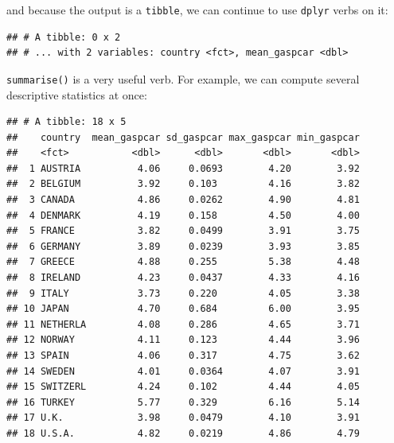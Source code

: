 \documentclass[]{gitbook}
\newenvironment{Shaded}{\begin{snugshade}}{\end{snugshade}}
\newcommand{\DataTypeTok}[1]{\textcolor[rgb]{0.13,0.29,0.53}{#1}}
\newcommand{\KeywordTok}[1]{\textcolor[rgb]{0.13,0.29,0.53}{\textbf{#1}}}
\newcommand{\NormalTok}[1]{#1}
\newcommand{\OperatorTok}[1]{\textcolor[rgb]{0.81,0.36,0.00}{\textbf{#1}}}
\newcommand{\StringTok}[1]{\textcolor[rgb]{0.31,0.60,0.02}{#1}}
\begin{document}
and because the output is a \texttt{tibble}, we can continue to use \texttt{dplyr} verbs on it:

\begin{Shaded}
\end{Shaded}

\begin{verbatim}
## # A tibble: 0 x 2
## # ... with 2 variables: country <fct>, mean_gaspcar <dbl>
\end{verbatim}

\texttt{summarise()} is a very useful verb. For example, we can compute several descriptive statistics at once:

\begin{Shaded}
\end{Shaded}

\begin{verbatim}
## # A tibble: 18 x 5
##    country  mean_gaspcar sd_gaspcar max_gaspcar min_gaspcar
##    <fct>           <dbl>      <dbl>       <dbl>       <dbl>
##  1 AUSTRIA          4.06     0.0693        4.20        3.92
##  2 BELGIUM          3.92     0.103         4.16        3.82
##  3 CANADA           4.86     0.0262        4.90        4.81
##  4 DENMARK          4.19     0.158         4.50        4.00
##  5 FRANCE           3.82     0.0499        3.91        3.75
##  6 GERMANY          3.89     0.0239        3.93        3.85
##  7 GREECE           4.88     0.255         5.38        4.48
##  8 IRELAND          4.23     0.0437        4.33        4.16
##  9 ITALY            3.73     0.220         4.05        3.38
## 10 JAPAN            4.70     0.684         6.00        3.95
## 11 NETHERLA         4.08     0.286         4.65        3.71
## 12 NORWAY           4.11     0.123         4.44        3.96
## 13 SPAIN            4.06     0.317         4.75        3.62
## 14 SWEDEN           4.01     0.0364        4.07        3.91
## 15 SWITZERL         4.24     0.102         4.44        4.05
## 16 TURKEY           5.77     0.329         6.16        5.14
## 17 U.K.             3.98     0.0479        4.10        3.91
## 18 U.S.A.           4.82     0.0219        4.86        4.79
\end{verbatim}
\end{document}

